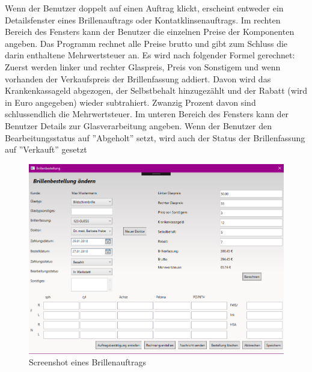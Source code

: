 Wenn der Benutzer doppelt auf einen Auftrag klickt, erscheint entweder ein Detailsfenster eines Brillenauftrags oder Kontatklinsenauftrags. Im rechten Bereich des Fensters kann der Benutzer die einzelnen Preise der Komponenten angeben. Das Programm rechnet alle Preise  brutto und gibt zum Schluss die darin enthaltene Mehrwertsteuer an. Es wird nach folgender Formel gerechnet: Zuerst werden linker und rechter Glaspreis, Preis von Sonstigem und wenn vorhanden der Verkaufspreis der Brillenfassung addiert. Davon wird das Krankenkassageld abgezogen, der Selbstbehalt hinzugezählt und der Rabatt (wird in Euro angegeben) wieder subtrahiert. Zwanzig Prozent davon sind schlussendlich die Mehrwertsteuer. 
Im unteren Bereich des Fensters kann der Benutzer Details zur Glasverarbeitung angeben. Wenn der Benutzer den Bearbeitungsstatus auf ''Abgeholt'' setzt, wird auch der Status der Brillenfassung auf ''Verkauft'' gesetzt
\begin{figure}[H]
\begin{center}
	\includegraphics[scale=.25]{images/Brillenauftrag.png}
\end{center}
	\caption{Screenshot eines Brillenauftrags}
	\label{fig:sample}
\end{figure}
